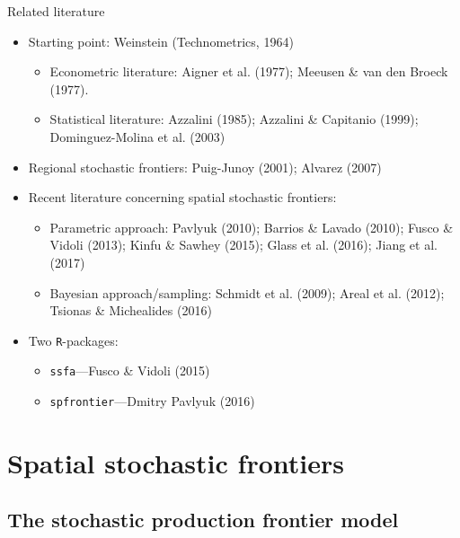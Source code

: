 \documentclass[presentation]{beamer}
\begin{document}
\begin{frame}{Related literature}
\begin{itemize}
	\item Starting point: Weinstein (Technometrics, 1964)
	\begin{itemize}
		\item Econometric literature: Aigner et al. (1977); Meeusen \& van den Broeck (1977). 
		\item Statistical literature: Azzalini (1985); Azzalini \& Capitanio (1999); Dominguez-Molina et al. (2003)
	\end{itemize}
	\pause
	\item Regional stochastic frontiers: Puig-Junoy (2001); Alvarez (2007)
	\pause
	\item Recent literature concerning spatial stochastic frontiers: 
	\begin{itemize}
		\item Parametric approach: Pavlyuk (2010); Barrios \& Lavado (2010); Fusco \& Vidoli (2013); Kinfu \& Sawhey (2015); Glass et al. (2016); Jiang et al. (2017)
		\item Bayesian approach/sampling: Schmidt et al. (2009); Areal et al. (2012); Tsionas \& Michealides (2016)
	\end{itemize}
	\pause
	\item Two \texttt{R}-packages:
	\begin{itemize}
		\item \texttt{ssfa}---Fusco \& Vidoli (2015)
		\item \texttt{spfrontier}---Dmitry Pavlyuk (2016)
	\end{itemize}
\end{itemize}
\end{frame} 

\section{Spatial stochastic frontiers}

\subsection{The stochastic production frontier model}
\end{document}
